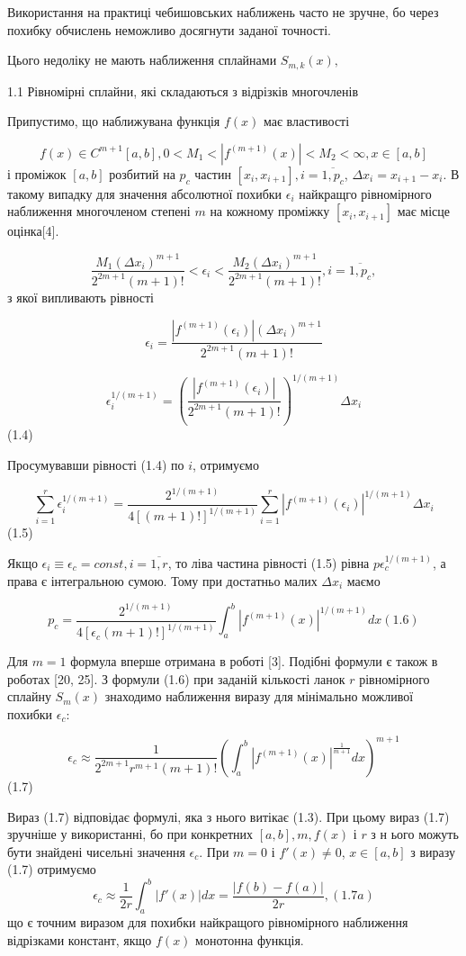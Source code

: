 \documentclass[ukrainian,14pt]{extarticle}
\begin{document}
Використання на практиці чебишовських наближень часто не зручне, бо через похибку обчислень неможливо досягнути заданої точності.

Цього недоліку не мають наближення сплайнами $S_{m, k}(x),$


1.1 Рівномірні сплайни, які складаються з відрізків многочленів

Припустимо, що наближувана функція $f(x)$ має властивості 

$$ f(x) \in C^{m+1}[a,b], 0 < M_1 < |f^{(m+1)}(x)| < M_2 < \infty, x \in [a, b]$$
і проміжок $[a, b]$ розбитий на $p_c$ частин $[x_i, x_{i+1}], i=\overline{1, p_c}$,
$\Delta x_i = x_{i+1} - x_i$. В такому випадку для значення абсолютної похибки $\epsilon_i$ найкращго рівномірного наближення многочленом степені $m$ на кожному проміжку $[x_i, x_{i+1}]$ має місце оцінка[4].

$$\frac {M_1(\Delta x_i)^{m+1}} {2^{2m+1} (m+1)!} < \epsilon_i < \frac {M_2(\Delta x_i)^{m+1}} {2^{2m+1} (m+1)!}, i = \overline{1, p_c} ,$$
з якої випливають рівності

$$\epsilon_i = \frac {|f^{(m+1)}(\epsilon_i)|(\Delta x_i)^{m+1}} {2^{2m+1} (m+1)!}$$

$$\epsilon_i^{1/(m+1)} = \left(\frac {|f^{(m+1)}(\epsilon_i)|} {2^{2m+1} (m+1)!} \right)^{1/(m+1)} \Delta x_i$$(1.4)

Просумувавши рівності (1.4) по $i$, отримуємо

$$\sum_{i=1}^r \epsilon_i ^{1/(m+1)} = \frac{2^{1/(m+1)}}{4 [(m+1)!]^{1/(m+1)}} \sum_{i=1}^r |f^{(m+1)}(\epsilon_i)|^{1/(m+1)} \Delta x_i$$ (1.5)

Якщо $\epsilon_i \equiv \epsilon_c = const, i = \overline{1, r}$, то ліва частина рівності (1.5) рівна $p \epsilon_c ^{1/(m+1)}$, а права є інтегральною сумою. Тому при достатньо малих $\Delta x_i$ маємо

$$p_c = \frac{2^{1/(m+1)}}{4[\epsilon_c (m+1)!]^{1/(m+1)}} \int_a^b |f^{(m+1)}(x)|^{1/(m+1)}dx (1.6)$$

Для $m = 1$ формула вперше отримана в роботі [3].
Подібні формули є також в роботах [20, 25]. З формули (1.6) при заданій кількості ланок $r$ рівномірного сплайну $S_m(x)$ знаходимо наближення виразу для мінімально можливої похибки $\epsilon_c$: 

$$\epsilon_c \approx \frac{1}{2^{2m+1} r^{m+1} (m+1)!} \left( \int_a^b \left|f^{(m+1)}(x)\right|^{\frac{1}{m+1} }dx \right)^{m+1}$$ (1.7)

Вираз (1.7) відповідає формулі, яка з нього витікає (1.3). При цьому вираз (1.7) зручніше у використанні, бо при конкретних $[a, b], m, f(x)$ і $r$ з н ього можуть бути знайдені чисельні значення $\epsilon_c$. При $m = 0$ і $f'(x) \neq 0$, $x \in [a, b]$ з виразу (1.7) отримуємо
$$ \epsilon_c \approx \frac{1}{2r} \int_a^b |f'(x)|dx = \frac{|f(b) - f(a)|}{2r}, (1.7a)$$
що є точним виразом для похибки найкращого рівномірного наближення відрізками констант, якщо $f(x)$ монотонна функція.
\end{document}
